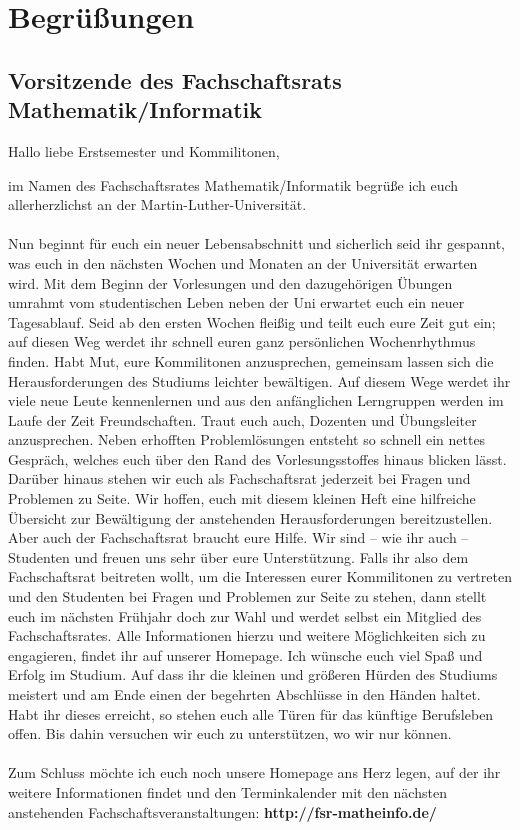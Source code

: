 \section{Begrüßungen}

\subsection{Vorsitzende des Fachschaftsrats Mathematik/Informatik}

Hallo liebe Erstsemester und Kommilitonen,

im Namen des Fachschaftsrates Mathematik/Informatik begrüße ich euch allerherzlichst an der Martin-Luther-Universität.
\\
\\
Nun beginnt für euch ein neuer Lebensabschnitt und sicherlich seid ihr gespannt, was euch in den nächsten Wochen und Monaten an der Universität erwarten wird. Mit dem Beginn der Vorlesungen und den dazugehörigen Übungen umrahmt vom studentischen Leben neben der Uni erwartet euch ein neuer Tagesablauf. 
Seid ab den ersten Wochen fleißig und teilt euch eure Zeit gut ein; auf diesen Weg werdet ihr schnell euren ganz persönlichen Wochenrhythmus finden.
Habt Mut, eure Kommilitonen anzusprechen, gemeinsam lassen sich die Herausforderungen des Studiums leichter bewältigen. Auf diesem Wege werdet ihr viele neue Leute kennenlernen und aus den anfänglichen Lerngruppen werden im Laufe der Zeit Freundschaften. Traut euch auch, Dozenten und Übungsleiter anzusprechen. Neben erhofften Problemlösungen entsteht so schnell ein nettes Gespräch, welches euch über den Rand des Vorlesungsstoffes hinaus blicken lässt.\\
Darüber hinaus stehen wir euch als Fachschaftsrat jederzeit bei Fragen und Problemen zu Seite. Wir hoffen, euch mit diesem kleinen Heft eine hilfreiche Übersicht zur Bewältigung der anstehenden Herausforderungen bereitzustellen.
Aber auch der Fachschaftsrat braucht eure Hilfe. Wir sind -- wie ihr auch -- Studenten und freuen uns sehr über eure Unterstützung. Falls ihr also dem Fachschaftsrat beitreten wollt, um die Interessen eurer Kommilitonen zu vertreten und den Studenten bei Fragen und Problemen zur Seite zu stehen, dann stellt euch im nächsten Frühjahr doch zur Wahl und werdet selbst ein Mitglied des Fachschaftsrates. Alle Informationen hierzu und weitere Möglichkeiten sich zu engagieren, findet ihr auf unserer Homepage.
Ich wünsche euch viel Spaß und Erfolg im Studium. Auf dass ihr die kleinen und größeren Hürden des Studiums meistert und am Ende einen der begehrten Abschlüsse in den Händen haltet. Habt ihr dieses erreicht, so stehen euch alle Türen für das künftige Berufsleben offen. Bis dahin versuchen wir euch zu unterstützen, wo wir nur können.\\
\\
Zum Schluss möchte ich euch noch unsere Homepage ans Herz legen, auf der ihr weitere Informationen findet und den Terminkalender mit den nächsten anstehenden Fachschaftsveranstaltungen: \textbf{http://fsr-matheinfo.de/}


